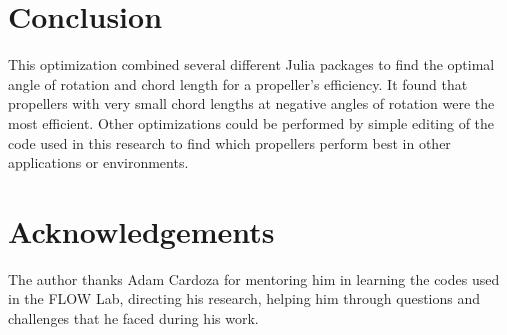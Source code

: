 \documentclass[journal ]{new-aiaa}
\begin{document}
\section{Conclusion}

This optimization combined several different Julia packages to find the optimal angle of rotation and chord length for a propeller's efficiency. It found that propellers with very small chord lengths at negative angles of rotation were the most efficient. Other optimizations could be performed by simple editing of the code used in this research to find which propellers perform best in other applications or environments. 


\section{Acknowledgements}

The author thanks Adam Cardoza for mentoring him in learning the codes used in the FLOW Lab, directing his research, helping him through questions and challenges that he faced during his work.




\end{document}
